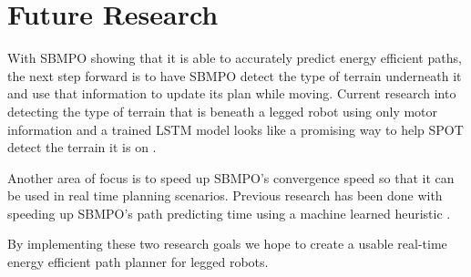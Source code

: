\documentclass[conference]{IEEEtran}
\begin{document}
\section{Future Research}

    With SBMPO showing that it is able to accurately predict energy efficient paths, the next step forward is to have SBMPO detect the type of terrain underneath it and use that information to update its plan while moving. Current research into detecting the type of terrain that is beneath a legged robot using only motor information and a trained LSTM model looks like a promising way to help SPOT detect the terrain it is on \cite{christopher}. 
    
    Another area of focus is to speed up SBMPO's convergence speed so that it can be used in real time planning scenarios. Previous research has been done with speeding up SBMPO's path predicting time using a machine learned heuristic \cite{carter}.
    
    By implementing these two research goals we hope to create a usable real-time energy efficient path planner for legged robots.



\end{document}
